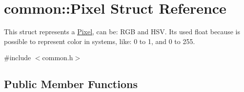 \hypertarget{structcommon_1_1Pixel}{}\section{common\+:\+:Pixel Struct Reference}
\label{structcommon_1_1Pixel}


This struct represents a \hyperlink{structcommon_1_1Pixel}{Pixel}, can be\+: R\+GB and H\+SV. It\textquotesingle{}s used float because is possible to represent color in systems, like\+: 0 to 1, and 0 to 255.  




{\ttfamily \#include $<$common.\+h$>$}

\subsection*{Public Member Functions}
